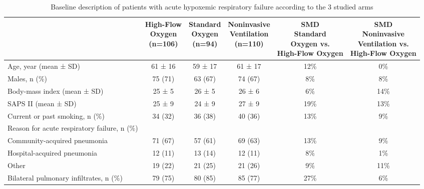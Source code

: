 \documentclass{article}
\begin{document}
\begin{center}
\begin{table}[!ht]%
\scriptsize
\caption{Baseline description of patients with acute hypoxemic respiratory failure according to the 3 studied arms\label{tabS5}}
\begin{tabular*}{\textwidth}{@{\extracolsep\fill}lccccc@{}}
\toprule
\textbf{} &  \makecell{\textbf{High-Flow} \\ \textbf{Oxygen}  \\ \textbf{(n=106)}}  & \makecell{\textbf{Standard} \\ \textbf{Oxygen} \\ \textbf{(n=94)}}  & \makecell{\textbf{Noninvasive} \\ \textbf{Ventilation} \\ \textbf{(n=110)}} & \makecell{\textbf{SMD} \\ \textbf{Standard} \\ \textbf{Oxygen vs.}  \\ \textbf{High-Flow Oxygen} }  & \makecell{\textbf{SMD} \\ \textbf{Noninvasive} \\ \textbf{Ventilation vs.}  \\ \textbf{High-Flow Oxygen}}   \\ \hline
Age, year (mean ± SD) & 61 ± 16 & 59 ± 17 & 61 ± 17 & 12\%  & 0\% \\
Males,  n (\%) & 75 (71) & 63 (67) & 74 (67) & 8\%  & 8\% \\
Body-mass index\tnote{$^*$} (mean ± SD) & 25 ± 5 & 26 ± 5 & 26 ± 6 & 6\% & 14\% \\
SAPS II\tnote{$^\dagger$} (mean ± SD) & 25 ± 9 & 24 ± 9 & 27 ± 9 & 19\%  & 13\% \\
Current or past smoking, n (\%) & 34 (32) & 36 (38) & 40 (36) & 13\% & 9\% \\
Reason for acute respiratory failure, n (\%) &  &  &  \\
\hspace{5mm}Community-acquired pneumonia & 71 (67) & 57 (61) & 69 (63) & 13\%  & 9\% \\
\hspace{5mm}Hospital-acquired pneumonia & 12 (11) & 13 (14) & 12 (11) & 8\%  & 1\% \\
\hspace{5mm}Other & 19 (22) & 21 (25) & 21 (26) & 9\% & 11\% \\
Bilateral pulmonary infiltrates, n (\%) & 79 (75) & 80 (85) & 85 (77) & 27\% & 6\% \\

\end{tabular*}
\end{table}
\end{center}
\end{document}
